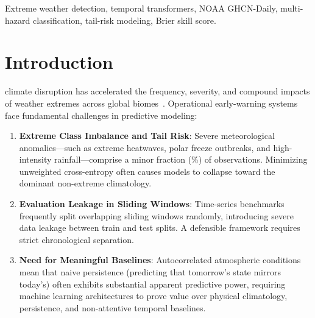 \documentclass[conference]{IEEEtran}
\begin{document}
\begin{IEEEkeywords}
Extreme weather detection, temporal transformers, NOAA GHCN-Daily, multi-hazard classification, tail-risk modeling, Brier skill score.
\end{IEEEkeywords}

\section{Introduction}
 climate disruption has accelerated the frequency, severity, and compound impacts of weather extremes across global biomes~\cite{ipcc2021}. Operational early-warning systems face fundamental challenges in predictive modeling:
\begin{enumerate}
    \item \textbf{Extreme Class Imbalance and Tail Risk}: Severe meteorological anomalies---such as extreme heatwaves, polar freeze outbreaks, and high-intensity rainfall---comprise a minor fraction (\prevalenceRate{}\%) of observations. Minimizing unweighted cross-entropy often causes models to collapse toward the dominant non-extreme climatology.
    \item \textbf{Evaluation Leakage in Sliding Windows}: Time-series benchmarks frequently split overlapping sliding windows randomly, introducing severe data leakage between train and test splits. A defensible framework requires strict chronological separation.
    \item \textbf{Need for Meaningful Baselines}: Autocorrelated atmospheric conditions mean that naive persistence (predicting that tomorrow's state mirrors today's) often exhibits substantial apparent predictive power, requiring machine learning architectures to prove value over physical climatology, persistence, and non-attentive temporal baselines.
\end{enumerate}
\end{document}
